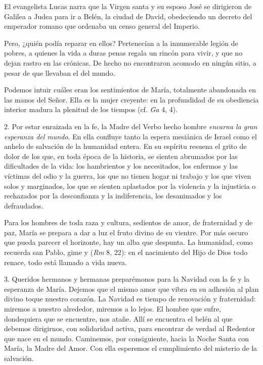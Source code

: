 \begin{body}
\begin{body}
El evangelista Lucas narra que la Virgen santa y su esposo José se dirigieron de Galilea a Judea para ir a Belén, la ciudad de David, obedeciendo un decreto del emperador romano que ordenaba un censo general del Imperio.

Pero, ¿quién podía reparar en ellos? Pertenecían a la innumerable legión de pobres, a quienes la vida a duras penas regala un rincón para vivir, y que no dejan rastro en las crónicas. De hecho no encontraron acomodo en ningún sitio, a pesar de que llevaban el  del mundo.

Podemos intuir cuáles eran los sentimientos de María, totalmente abandonada en las manos del Señor. Ella es la mujer creyente: en la profundidad de su obediencia interior madura la plenitud de los tiempos (cf. \emph{Ga} 4, 4).

2. Por estar enraizada en la fe, la Madre del Verbo hecho hombre \emph{encarna la gran esperanza del mundo}. En ella confluye tanto la espera mesiánica de Israel como el anhelo de salvación de la humanidad entera. En su espíritu resuena el grito de dolor de los que, en toda época de la historia, se sienten abrumados por las dificultades de la vida: los hambrientos y los necesitados, los enfermos y las víctimas del odio y la guerra, los que no tienen hogar ni trabajo y los que viven solos y marginados, los que se sienten aplastados por la violencia y la injusticia o rechazados por la desconfianza y la indiferencia, los desanimados y los defraudados.

Para los hombres de toda raza y cultura, sedientos de amor, de fraternidad y de paz, María se prepara a dar a luz el fruto divino de su vientre. Por más oscuro que pueda parecer el horizonte, hay un alba que despunta. La humanidad, como recuerda san Pablo, gime y  (\emph{Rm} 8, 22): en el nacimiento del Hijo de Dios todo renace, todo está llamado a vida nueva.

3. Queridos hermanos y hermanas preparémonos para la Navidad con la fe y la esperanza de María. Dejemos que el mismo amor que vibra en su adhesión al plan divino toque nuestro corazón. La Navidad es tiempo de renovación y fraternidad: miremos a nuestro alrededor, miremos a lo lejos. El hombre que sufre, dondequiera que se encuentre, nos atañe. Allí se encuentra el belén al que debemos dirigirnos, con solidaridad activa, para encontrar de verdad al Redentor que nace en el mundo. Caminemos, por consiguiente, hacia la Noche Santa con María, la Madre del Amor. Con ella esperemos el cumplimiento del misterio de la salvación.



\end{body}
\end{body}
